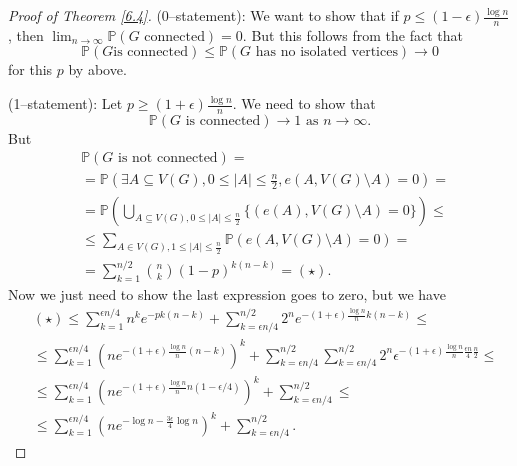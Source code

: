 \documentclass{article}
\theoremstyle{definition}
\begin{document}
\begin{proof}[Proof of Theorem \ref{6.4}]
    (0--statement): We want to show that if $p\le (1-\epsilon)\frac{\log n}{n}$, then $\lim_{n \to \infty} \mathbb{P}(G \text{ connected}) = 0$. But this follows from the fact that $$\mathbb{P}(G \text{is connected})\le \mathbb{P}(G \text{ has no isolated vertices}) \to 0$$
    for this $p$ by above.
    \vspace{1mm}
    
    (1--statement): Let $p\ge (1+\epsilon)\frac{\log n}{n}$. We need to show that 
    \[
    \mathbb{P}(G \text{ is connected}) \to 1 \text{ as }n \to \infty.
    \]
    But 
    \begin{align*}
        &\mathbb{P}(G \text{ is not connected}) = \\
        &=\mathbb{P}(\exists A \subseteq V(G), 0\le |A|\le \frac{n}{2}, e(A,V(G)\setminus A)=0) = \\
        & =\mathbb{P}\left( \bigcup_{A \subseteq V(G), 0\le |A|\le \frac{n}{2}} \{(e(A),V(G)\setminus A)=0\}\right) \le \\
        &\le \sum_{A \in V(G), 1\le |A|\le \frac{n}{2}}^{} \mathbb{P}(e(A,V(G)\setminus A)=0) = \\
        &= \sum_{k=1}^{n/2} {n\choose{k}}(1-p)^{k(n-k)} = (\star).
    \end{align*}
    Now we just need to show the last expression goes to zero, but we have
    \begin{align*}
        &(\star) \le \sum_{k=1}^{\epsilon n/4} n^k e^{-pk(n-k)} + \sum_{k=\epsilon n/4}^{n/2} 2^n e^{-(1+\epsilon)\frac{\log n}{n}k(n-k)} \le \\
        &\le \sum_{k=1}^{\epsilon n/4} \left(n e^{-(1+\epsilon)\frac{\log n}{n}(n-k)}\right)^k + \sum_{k=\epsilon n/4}^{n/2} \sum_{k=\epsilon n/4}^{n/2} 2^n \epsilon^{-(1+\epsilon)\frac{\log n}{n} \frac{\epsilon n}{4} \frac{n}{2}} \le \\
        &\le \sum_{k=1}^{\epsilon n/4} \left(ne^{-(1+\epsilon)\frac{\log n}{n}n(1-\epsilon/4)}\right)^k + \sum_{k=\epsilon n/4}^{n/2} \le \\
        &\le \sum_{k=1}^{\epsilon n/4} \left( n e^{-\log n - \frac{3 \epsilon}{4}\log n} \right)^k + \sum_{k=\epsilon n/4}^{n/2}.
    \end{align*} 
\end{proof}
\end{document}
